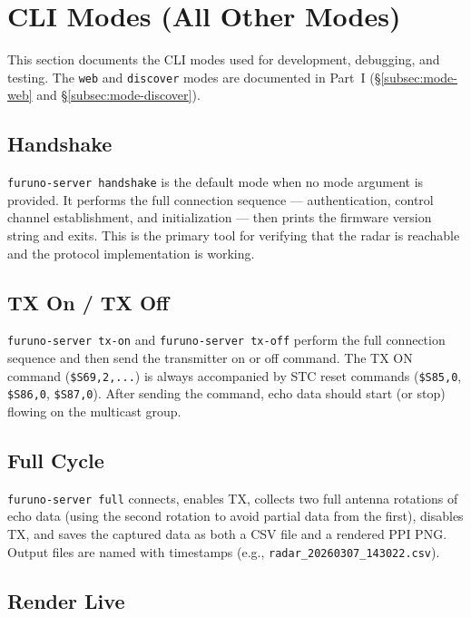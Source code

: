 \documentclass[11pt,letterpaper]{article}
\begin{document}
\newpage
\section{CLI Modes (All Other Modes)}
\label{sec:cli-modes-dev}

This section documents the CLI modes used for development, debugging, and testing. The \texttt{web} and \texttt{discover} modes are documented in Part~I (\S\ref{subsec:mode-web} and \S\ref{subsec:mode-discover}).

\subsection{Handshake}
\label{subsec:cli-handshake}

\texttt{furuno-server handshake} is the default mode when no mode argument is provided. It performs the full connection sequence --- authentication, control channel establishment, and initialization --- then prints the firmware version string and exits. This is the primary tool for verifying that the radar is reachable and the protocol implementation is working.

\subsection{TX On / TX Off}
\label{subsec:cli-tx}

\texttt{furuno-server tx-on} and \texttt{furuno-server tx-off} perform the full connection sequence and then send the transmitter on or off command. The TX ON command (\texttt{\$S69,2,...}) is always accompanied by STC reset commands (\texttt{\$S85,0}, \texttt{\$S86,0}, \texttt{\$S87,0}). After sending the command, echo data should start (or stop) flowing on the multicast group.

\subsection{Full Cycle}
\label{subsec:cli-full}

\texttt{furuno-server full} connects, enables TX, collects two full antenna rotations of echo data (using the second rotation to avoid partial data from the first), disables TX, and saves the captured data as both a CSV file and a rendered PPI PNG. Output files are named with timestamps (e.g., \texttt{radar\_20260307\_143022.csv}).

\subsection{Render Live}
\label{subsec:cli-render-live}
\end{document}
